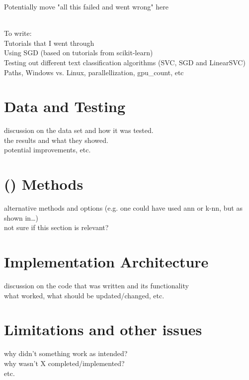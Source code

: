 Potentially move "all this failed and went wrong" here

~\\
To write: \\
Tutorials that I went through \\
Using SGD (based on tutorials from scikit-learn) \\
Testing out different text classification algorithms (SVC, SGD and LinearSVC) \\
Paths, Windows vs. Linux, parallellization, gpu\_count, etc

\section{Data and Testing}
\label{sec:data_and_testing}
discussion on the data set and how it was tested. \\
the results and what they showed.  \\
potential improvements, etc.

\section[Artificial Intelligence Methods]{ () Methods}
\label{sec:ai_methods}
alternative methods and options (e.g. one could have used ann or k-nn, but as shown in\ldots) \\
not sure if this section is relevant?

\section{Implementation Architecture}
\label{sec:implemented_architecture}
discussion on the code that was written and its functionality \\
what worked, what should be updated/changed, etc.

\section{Limitations and other issues}
\label{sec:limitations_and_issues}
why didn't something work as intended? \\
why wasn't X completed/implemented? \\
etc.
